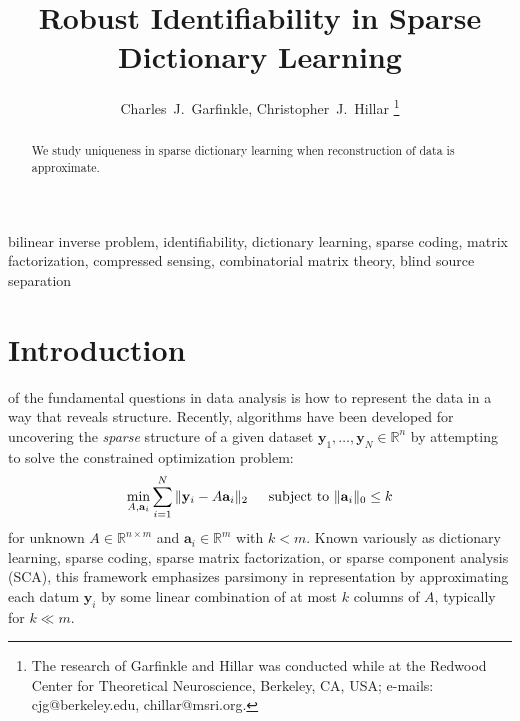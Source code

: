 \documentclass[journal, onecolumn]{IEEEtran}
\begin{document}
\title{Robust Identifiability in Sparse Dictionary Learning}

\author{Charles~J.~Garfinkle,  Christopher~J.~Hillar%
\thanks{The research of Garfinkle and Hillar was conducted while at the Redwood Center for Theoretical Neuroscience, Berkeley, CA, USA; e-mails: cjg@berkeley.edu, chillar@msri.org.}}%

\maketitle

\begin{abstract}
We study uniqueness in sparse dictionary learning when reconstruction of data is approximate.
\end{abstract}

\begin{IEEEkeywords}
bilinear inverse problem, identifiability, dictionary learning, sparse coding, matrix factorization, compressed sensing, combinatorial matrix theory, blind source separation
\end{IEEEkeywords}


\section{Introduction}

 of the fundamental questions in data analysis is how to represent the data in a way that reveals structure. Recently, algorithms have been developed for uncovering the \emph{sparse} structure of a given dataset $\mathbf{y}_1, \ldots, \mathbf{y}_N \in \mathbb{R}^n$ by attempting to solve the constrained optimization problem:
\begin{align}\label{DictionaryLearning}
\min_{A, \mathbf{a}_i} \sum_{i=1}^N \|\mathbf{y}_i - A\mathbf{a}_i\|_2 \indent \text{subject to } \|\mathbf{a}_i\|_0 \leq k 
\end{align}
%
for unknown $A \in \mathbb{R}^{n \times m}$ and $\mathbf{a}_i \in \mathbb{R}^m$ with $k < m$. Known variously as dictionary learning, sparse coding, sparse matrix factorization, or sparse component analysis (SCA), this framework emphasizes parsimony in representation by approximating each datum $\mathbf{y}_i$ by some linear combination of at most $k$ columns of $A$, typically for $k \ll m$. 
\end{document}
